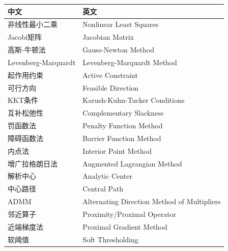 \begin{table}[htbp]
\centering
\begin{tabular}{@{}ll@{}}
\toprule
\textbf{中文} & \textbf{英文} \\
\midrule
非线性最小二乘 & Nonlinear Least Squares \\
Jacobi矩阵 & Jacobian Matrix \\
高斯-牛顿法 & Gauss-Newton Method \\
Levenberg-Marquardt & Levenberg-Marquardt Method \\
起作用约束 & Active Constraint \\
可行方向 & Feasible Direction \\
KKT条件 & Karush-Kuhn-Tucker Conditions \\
互补松弛性 & Complementary Slackness \\
罚函数法 & Penalty Function Method \\
障碍函数法 & Barrier Function Method \\
内点法 & Interior Point Method \\
增广拉格朗日法 & Augmented Lagrangian Method \\
解析中心 & Analytic Center \\
中心路径 & Central Path \\
ADMM & Alternating Direction Method of Multipliers \\
邻近算子 & Proximity/Proximal Operator \\
近端梯度法 & Proximal Gradient Method \\
软阈值 & Soft Thresholding \\
\bottomrule
\end{tabular}
\end{table}

\newpage


